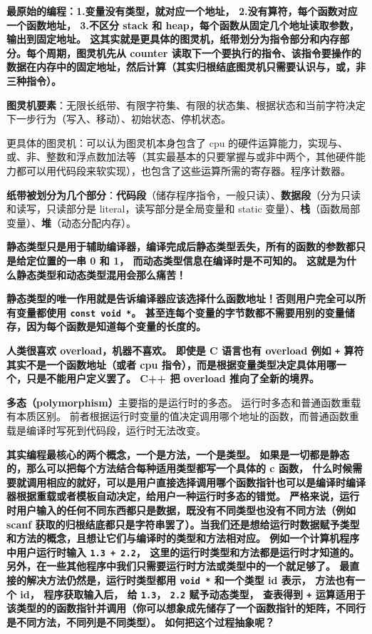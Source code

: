 
\begin{issues}
\issueDraft
\end{issues}

\textbf{最原始的编程：1.变量没有类型，就对应一个地址， 2.没有算符，每个函数对应一个函数地址， 3.不区分 stack 和 heap，每个函数从固定几个地址读取参数，输出到固定地址。 这其实就是更具体的图灵机，纸带划分为指令部分和内存部分。每个周期，图灵机先从 counter 读取下一个要执行的指令、该指令要操作的数据在内存中的固定地址，然后计算（其实归根结底图灵机只需要认识与，或，非三种指令）。}

\textbf{图灵机要素}：无限长纸带、有限字符集、有限的状态集、根据状态和当前字符决定下一步行为（写入、移动）、初始状态、停机状态。

更具体的图灵机：可以认为图灵机本身包含了 cpu 的硬件运算能力，实现与、或、非、整数和浮点数加法等（其实最基本的只要掌握与或非中两个，其他硬件能力都可以用代码段来软实现），也包含了这些运算所需的寄存器。程序计数器。

\textbf{纸带被划分为几个部分}：\textbf{代码段}（储存程序指令，一般只读）、\textbf{数据段}（分为只读和读写，只读部分是 literal，读写部分是全局变量和 static 变量）、\textbf{栈}（函数局部变量）、\textbf{堆}（动态分配内存）。

\textbf{静态类型只是用于辅助编译器，编译完成后静态类型丢失，所有的函数的参数都只是给定位置的一串 0 和 1， 而动态类型信息在编译时是不可知的。 这就是为什么静态类型和动态类型混用会那么痛苦！}

\textbf{静态类型的唯一作用就是告诉编译器应该选择什么函数地址！否则用户完全可以所有变量都使用 \verb`const void *`。 甚至连每个变量的字节数都不需要用别的变量储存，因为每个函数是知道每个变量的长度的。}

\textbf{人类很喜欢 overload，机器不喜欢。 即使是 C 语言也有 overload 例如 \verb`+` 算符其实不是一个函数地址（或者 cpu 指令），而是根据变量类型决定具体用哪一个，只是不能用户定义罢了。 C++ 把 overload 推向了全新的境界。}

\textbf{多态（polymorphism）}主要指的是运行时的多态。 运行时多态和普通函数重载有本质区别。 前者根据运行时变量的值决定调用哪个地址的函数，而普通函数重载是编译时写死到代码段，运行时无法改变。

\textbf{其实编程最核心的两个概念，一个是\textbf{方法}，一个是\textbf{类型}。 如果是一切都是静态的，那么可以把每个方法结合每种适用类型都写一个具体的 c 函数， 什么时候需要就调用相应的就好，可以是用户直接选择调用哪个函数指针也可以是编译时编译器根据重载或者模板自动决定，给用户一种运行时多态的错觉。 严格来说，运行时用户输入的任何不同东西都只是数据，既没有不同类型也没有不同方法（例如 scanf 获取的归根结底都只是字符串罢了）。当我们还是想给运行时数据赋予类型和方法的概念，且想让它们与编译时的类型和方法相对应。 例如一个计算机程序中用户运行时输入 \verb`1.3 + 2.2`， 这里的运行时类型和方法都是运行时才知道的。 另外，在一些其他程序中我们只需要运行时方法或类型中的一个就足够了。 最直接的解决方法仍然是，运行时类型都用 \verb`void *` 和一个类型 id 表示， 方法也有一个 id， 程序获取输入后， 给 \verb`1.3`， \verb`2.2` 赋予动态类型， 查表得到 \verb`+` 运算适用于该类型的的函数指针并调用（你可以想象成先储存了一个函数指针的矩阵，不同行是不同方法，不同列是不同类型）。 如何把这个过程抽象呢？}

